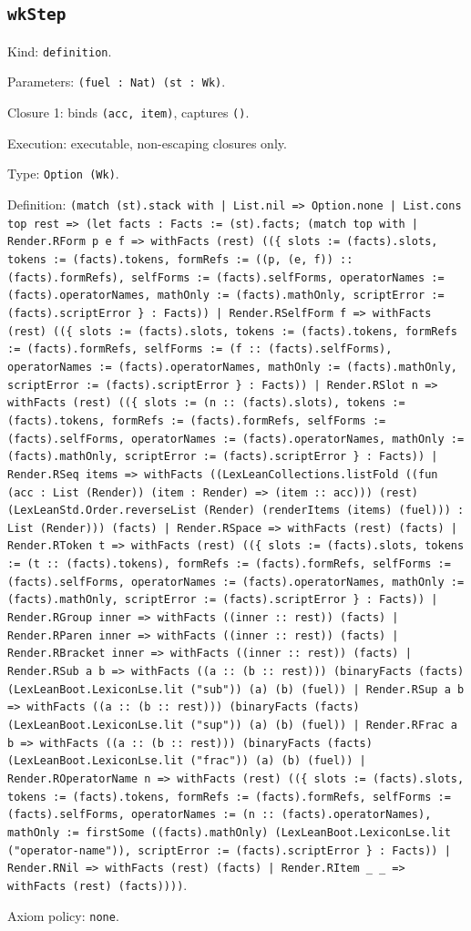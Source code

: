 \documentclass[11pt]{article}
\begin{document}
\subsection*{\texttt{wkStep}}
\noindent Kind: \texttt{definition}.\par
\noindent Parameters: \texttt{(fuel : Nat) (st : Wk)}.\par
\noindent Closure 1: binds \texttt{(acc, item)}, captures \texttt{()}.\par
\noindent Execution: executable, non-escaping closures only.\par
\noindent Type: \texttt{Option (Wk)}.\par
\noindent Definition: \texttt{(match (st).stack with | List.nil => Option.none | List.cons top rest => (let facts : Facts := (st).facts; (match top with | Render.RForm p e f => withFacts (rest) ((\{ slots := (facts).slots, tokens := (facts).tokens, formRefs := ((p, (e, f)) :: (facts).formRefs), selfForms := (facts).selfForms, operatorNames := (facts).operatorNames, mathOnly := (facts).mathOnly, scriptError := (facts).scriptError \} : Facts)) | Render.RSelfForm f => withFacts (rest) ((\{ slots := (facts).slots, tokens := (facts).tokens, formRefs := (facts).formRefs, selfForms := (f :: (facts).selfForms), operatorNames := (facts).operatorNames, mathOnly := (facts).mathOnly, scriptError := (facts).scriptError \} : Facts)) | Render.RSlot n => withFacts (rest) ((\{ slots := (n :: (facts).slots), tokens := (facts).tokens, formRefs := (facts).formRefs, selfForms := (facts).selfForms, operatorNames := (facts).operatorNames, mathOnly := (facts).mathOnly, scriptError := (facts).scriptError \} : Facts)) | Render.RSeq items => withFacts ((LexLeanCollections.listFold ((fun (acc : List (Render)) (item : Render) => (item :: acc))) (rest) (LexLeanStd.Order.reverseList (Render) (renderItems (items) (fuel))) : List (Render))) (facts) | Render.RSpace => withFacts (rest) (facts) | Render.RToken t => withFacts (rest) ((\{ slots := (facts).slots, tokens := (t :: (facts).tokens), formRefs := (facts).formRefs, selfForms := (facts).selfForms, operatorNames := (facts).operatorNames, mathOnly := (facts).mathOnly, scriptError := (facts).scriptError \} : Facts)) | Render.RGroup inner => withFacts ((inner :: rest)) (facts) | Render.RParen inner => withFacts ((inner :: rest)) (facts) | Render.RBracket inner => withFacts ((inner :: rest)) (facts) | Render.RSub a b => withFacts ((a :: (b :: rest))) (binaryFacts (facts) (LexLeanBoot.LexiconLse.lit ("sub")) (a) (b) (fuel)) | Render.RSup a b => withFacts ((a :: (b :: rest))) (binaryFacts (facts) (LexLeanBoot.LexiconLse.lit ("sup")) (a) (b) (fuel)) | Render.RFrac a b => withFacts ((a :: (b :: rest))) (binaryFacts (facts) (LexLeanBoot.LexiconLse.lit ("frac")) (a) (b) (fuel)) | Render.ROperatorName n => withFacts (rest) ((\{ slots := (facts).slots, tokens := (facts).tokens, formRefs := (facts).formRefs, selfForms := (facts).selfForms, operatorNames := (n :: (facts).operatorNames), mathOnly := firstSome ((facts).mathOnly) (LexLeanBoot.LexiconLse.lit ("operator-name")), scriptError := (facts).scriptError \} : Facts)) | Render.RNil => withFacts (rest) (facts) | Render.RItem \_ \_ => withFacts (rest) (facts))))}.\par
\noindent Axiom policy: \texttt{none}.\par
\end{document}
